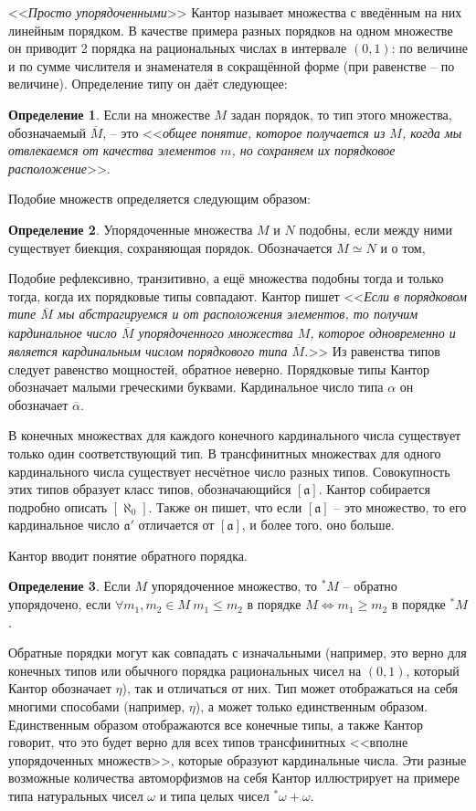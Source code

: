\documentclass[a4paper,12pt]{extarticle}
\theoremstyle{definition}
\newtheorem{definition}{Определение}
\newcommand{\cit}[1]{<<\textit{#1}>>}
\newcommand{\car}[1]{\overline{\overline{#1}}}
\begin{document}
\cit{Просто упорядоченными} Кантор называет множества с введённым на них линейным порядком.
В качестве примера разных порядков на одном множестве он приводит 2 порядка на рациональных числах в интервале $(0, 1)$:
по величине и по сумме числителя и знаменателя в сокращённой форме (при равенстве -- по величине).
Определение типу он даёт следующее:
\begin{definition}
    Если на множестве $M$ задан порядок, то тип этого множества, обозначаемый $\overline{M}$, -- это 
    \cit{общее понятие, которое получается из $M$, когда мы отвлекаемся от качества элементов $m$, но сохраняем их порядковое расположение}.
\end{definition}
Подобие множеств определяется следующим образом:
\begin{definition}
    Упорядоченные множества $M$ и $N$ подобны, если между ними существует биекция, сохраняющая порядок. Обозначается $M \simeq N$
и о том, \end{definition}
Подобие рефлексивно, транзитивно, а ещё множества подобны тогда и только тогда, когда их порядковые типы совпадают.
Кантор пишет \cit{Если в порядковом типе $\overline{M}$ мы абстрагируемся и от расположения элементов,
то получим кардинальное число $\car{M}$ упорядоченного множества $M$, которое одновременно и является кардинальным числом порядкового типа $\overline{M}$.}
Из равенства типов следует равенство мощностей, обратное неверно.
Порядковые типы Кантор обозначает малыми греческими буквами.
Кардинальное число типа $\alpha$ он обозначает $\overline{\alpha}$.

В конечных множествах для каждого конечного кардинального числа существует только один соответствующий тип.
В трансфинитных множествах для одного кардинального числа существует несчётное число разных типов.
Совокупность этих типов образует класс типов, обозначающийся $[\mathfrak{a}]$.
Кантор собирается подробно описать $[\aleph_0]$.
Также он пишет, что если $[\mathfrak{a}]$ -- это множество, то его кардинальное число $\mathfrak{a'}$ отличается от $[\mathfrak{a}]$, и более того, оно больше.

Кантор вводит понятие обратного порядка.
\begin{definition}
    Если $M$ упорядоченное множество, то $^*M$ -- обратно упорядочено, если $\forall m_1, m_2 \in M~m_1 \leqslant m_2$ в порядке $M \iff m_1 \geqslant m_2$ в порядке $^*M$.
\end{definition}
Обратные порядки могут как совпадать с изначальными (например, это верно для конечных типов или обычного порядка рациональных чисел на $(0, 1)$,
который Кантор обозначает $\eta$), так и отличаться от них.
Тип может отображаться на себя многими способами (например, $\eta$), а может только единственным образом.
Единственным образом отображаются все конечные типы, а также Кантор говорит, что это будет верно для всех типов трансфинитных <<вполне упорядоченных множеств>>, которые образуют кардинальные числа.
Эти разные возможные количества автоморфизмов на себя Кантор иллюстрирует на примере типа натуральных чисел $\omega$ и типа целых чисел $^*\omega + \omega$.
\end{document}

